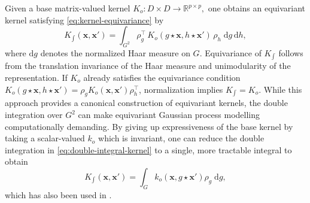 \documentclass[11pt,a4paper]{article}
\newcommand{\Kbase}{K_o}
\newcommand{\bx}{\boldsymbol{x}}
\begin{document}
Given a base matrix-valued kernel $\Kbase : D\times D \to \mathbb{R}^{p\times p},$ %
one obtains an equivariant kernel satisfying \eqref{eq:kernel-equivariance} by
\begin{equation}\label{eq:double-integral-kernel} K_{\int}(\boldsymbol{x},\boldsymbol{x}') = \int_{G^2} \rho_g^{\top}\, \Kbase(g\star \boldsymbol{x}, h\star \boldsymbol{x'}) \,\rho_h \;\mathrm{d}g\,\mathrm{d}h,\end{equation}
where $\mathrm{d}g$ denotes the normalized Haar measure on $G$.
Equivariance of $K_{\int}$ follows from the translation invariance of the Haar measure and unimodularity of the representation.
If $\Kbase$ already satisfies the equivariance condition
$ \Kbase(g\star \bx, h\star \bx') = \rho_g \Kbase(\bx,\bx') \rho_h^\top$,
normalization implies $K_{\int}=\Kbase$.
While this approach provides a canonical construction of equivariant kernels, the double integration over $G^2$ can make
equivariant Gaussian process modelling computationally demanding. By giving up expressiveness of the base kernel by taking a scalar-valued $k_o$ which is invariant, one can reduce the double integration in \eqref{eq:double-integral-kernel} to a single, more tractable integral to obtain
\begin{displaymath}K_{\int}(\boldsymbol{x},\boldsymbol{x}') = \int_{G} k_o(\boldsymbol{x}, g\star \boldsymbol{x'})\rho_g \;\mathrm{d}g,\end{displaymath}
which has also been used in \cite{PhysRevB.95.214302}.

\end{document}
